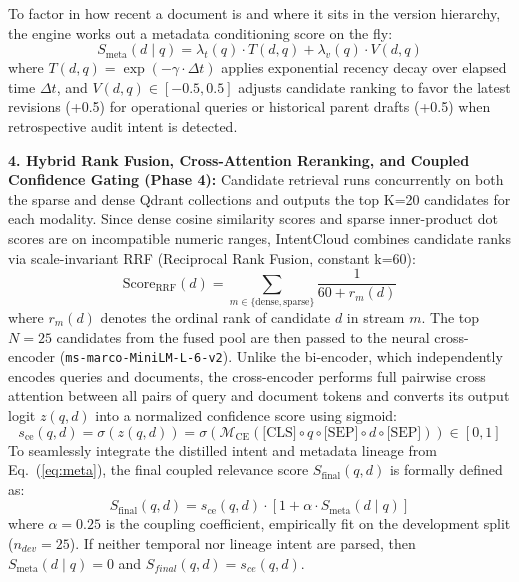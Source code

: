 \documentclass[a4paper,12pt]{article}
\begin{document}
To factor in how recent a document is and where it sits in the version hierarchy, the engine works out a metadata conditioning score on the fly:
\begin{equation}
S_{\text{meta}}(d \mid q) = \lambda_t(q) \cdot T(d, q) + \lambda_v(q) \cdot V(d, q)
\label{eq:meta}
\end{equation}
where $T(d, q) = \exp(-\gamma \cdot \Delta t)$ applies exponential recency decay over elapsed time $\Delta t$, and $V(d, q) \in [-0.5, 0.5]$ adjusts candidate ranking to favor the latest revisions (+0.5) for operational queries or historical parent drafts (+0.5) when retrospective audit intent is detected.

\vspace{0.4em}
\noindent\textbf{4. Hybrid Rank Fusion, Cross-Attention Reranking, and Coupled Confidence Gating (Phase 4):}
Candidate retrieval runs concurrently on both the sparse and dense Qdrant collections and outputs the top K=20 candidates for each modality. Since dense cosine similarity scores and sparse inner-product dot scores are on incompatible numeric ranges, IntentCloud combines candidate ranks via scale-invariant RRF (Reciprocal Rank Fusion, constant k=60):
\begin{equation}
\text{Score}_{\text{RRF}}(d) = \sum_{m \in \{\text{dense}, \text{sparse}\}} \frac{1}{60 + r_m(d)}
\end{equation}
where $r_m(d)$ denotes the ordinal rank of candidate $d$ in stream $m$. The top $N=25$ candidates from the fused pool are then passed to the neural cross-encoder (\texttt{ms-marco-MiniLM-L-6-v2}). Unlike the bi-encoder, which independently encodes queries and documents, the cross-encoder performs full pairwise cross attention between all pairs of query and document tokens and converts its output logit $z(q, d)$ into a normalized confidence score using sigmoid:
\begin{equation}
s_{\text{ce}}(q, d) = \sigma(z(q, d)) = \sigma\left(\mathcal{M}_{\text{CE}}(\text{[CLS]} \circ q \circ \text{[SEP]} \circ d \circ \text{[SEP]})\right) \in [0, 1]
\end{equation}
To seamlessly integrate the distilled intent and metadata lineage from Eq.~(\ref{eq:meta}), the final coupled relevance score $S_{\text{final}}(q, d)$ is formally defined as:
\begin{equation}
S_{\text{final}}(q, d) = s_{\text{ce}}(q, d) \cdot \left[1 + \alpha \cdot S_{\text{meta}}(d \mid q)\right]
\label{eq:final_score}
\end{equation}
where $\alpha=0.25$ is the coupling coefficient, empirically fit on the development split ($n_{dev}=25$). If neither temporal nor lineage intent are parsed, then $S_{\text{meta}}(d\mid q) = 0$ and $S_{final}(q, d) = s_{ce}(q, d)$.
\end{document}
